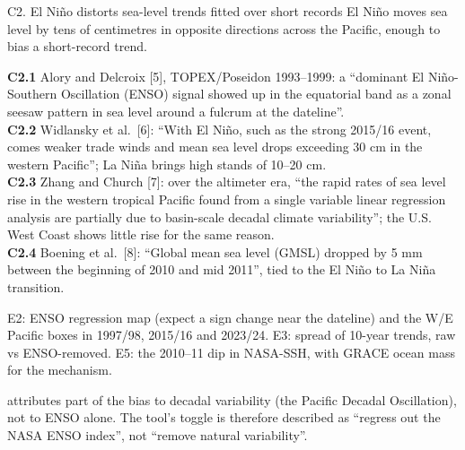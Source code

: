 \documentclass[10pt]{article}
\begin{document}
\begin{claimbox}{C2. El Ni\~no distorts sea-level trends fitted over short records}
El Ni\~no moves sea level by tens of centimetres in opposite directions across the Pacific, enough to bias a short-record trend.
\end{claimbox}
\begin{libox}
\textbf{C2.1} Alory and Delcroix [5], TOPEX/Poseidon 1993--1999: a ``dominant El Ni\~no-Southern Oscillation (ENSO) signal showed up in
the equatorial band as a zonal seesaw pattern in sea level around a fulcrum at the dateline''.\\
\textbf{C2.2} Widlansky et al.\ [6]: ``With El Ni\~no, such as the strong 2015/16 event, comes weaker trade winds and mean sea level drops
exceeding 30 cm in the western Pacific''; La Ni\~na brings high stands of 10--20 cm.\\
\textbf{C2.3} Zhang and Church [7]: over the altimeter era, ``the rapid rates of sea level rise in the western tropical Pacific found from a single
variable linear regression analysis are partially due to basin-scale decadal climate variability''; the U.S. West Coast shows little
rise for the same reason.\\
\textbf{C2.4} Boening et al.\ [8]: ``Global mean sea level (GMSL) dropped by 5 mm between the beginning of 2010 and mid 2011'', tied to the
El Ni\~no to La Ni\~na transition.
\end{libox}
\begin{nubox}
E2: ENSO regression map (expect a sign change near the dateline) and the W/E Pacific boxes in 1997/98, 2015/16 and 2023/24.
E3: spread of 10-year trends, raw vs ENSO-removed. E5: the 2010--11 dip in NASA-SSH, with GRACE ocean mass for the mechanism.
\end{nubox}
\begin{cabox}
[7] attributes part of the bias to decadal variability (the Pacific Decadal Oscillation), not to ENSO alone. The tool's toggle is
therefore described as ``regress out the NASA ENSO index'', not ``remove natural variability''.
\end{cabox}
\end{document}
